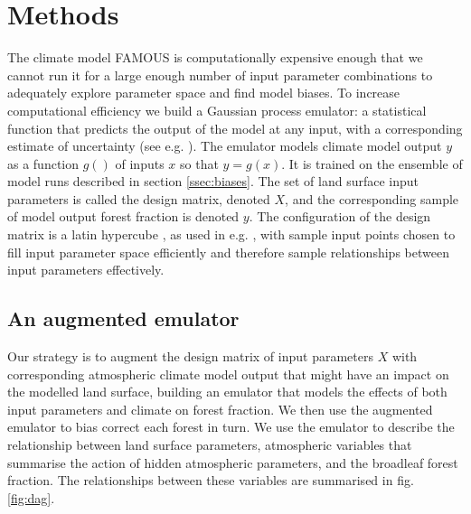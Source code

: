 \documentclass[gmd, manuscript]{copernicus}
\begin{document}
\section{Methods}\label{sec:methods}
The climate model FAMOUS is computationally expensive enough that we cannot run it for a large enough number of input parameter combinations to adequately explore parameter space and find model biases. To increase computational efficiency we build a Gaussian process emulator: a statistical function that predicts the output of the model at any input, with a corresponding estimate of uncertainty (see e.g. \cite{sacks1989design, kennedy2001bayesian}). The emulator models climate model output $y$ as a function $g()$ of inputs $x$ so that $y = g(x)$. It is trained on the ensemble of model runs described in section \ref{ssec:biases}. The set of land surface input parameters is called the design matrix, denoted $X$, and the corresponding sample of model output forest fraction is denoted $y$. The configuration of the design matrix is a latin hypercube \citep{mckay1979comparison}, as used in e.g. \cite{gregoire2010optimal,williams2013optimising}, with sample input points chosen to fill input parameter space efficiently and therefore sample relationships between input parameters effectively.

\subsection{An augmented emulator}\label{ssec:augmented}
Our strategy is to augment the design matrix of input parameters $X$ with corresponding atmospheric climate model output that might have an impact on the modelled land surface, building an emulator that models the effects of both input parameters and climate on forest fraction. We then use the augmented emulator to bias correct each forest in turn. We use the emulator to describe the relationship between land surface parameters, atmospheric variables that summarise the action of hidden atmospheric parameters, and the broadleaf forest fraction. The relationships between these variables are summarised in fig. \ref{fig:dag}. 
\end{document}
